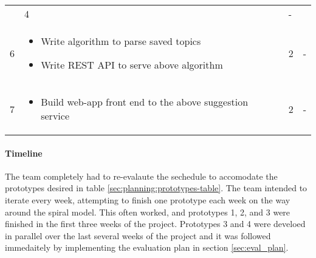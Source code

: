\begin{table*}[t]
\begin{tabular}{ l p{10cm} l l}
\begin{itemize}
        \end{itemize} &
                        4 & - \\
    6 &
        \begin{itemize}
        \item Write algorithm to parse saved topics
        \item Write REST API to serve above algorithm
        \end{itemize} &
                        2 & - \\
    7 &
        \begin{itemize}
        \item Build web-app front end to the above suggestion service
        \end{itemize} &
                        2 & - 
  \end{tabular} \label{sec:planning:prototypes-table}
\end{table*}

\paragraph{Timeline}
The team completely had to re-evalaute the sechedule to accomodate the
prototypes desired in table \ref{sec:planning:prototypes-table}.
The team intended to iterate every week, attempting to finish one
prototype each week on the way around the spiral model.
This often worked, and prototypes 1, 2, and 3 were finished in the
first three weeks of the project.
Prototypes 3 and 4 were develoed in parallel over the last several
weeks of the project and it was followed immedaitely by implementing
the evaluation plan in section \ref{sec:eval_plan}.

